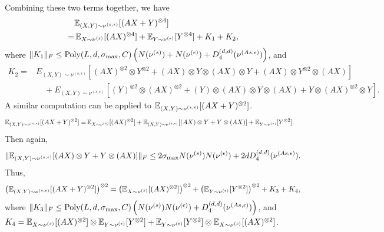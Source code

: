 Combining these two terms together, we have 
\begin{align*}
& \mathbb{E}_{(X,Y)\sim \nu^{(s,\epsilon)}} [(AX+Y)^{\otimes 4}]\\
 = & \,\mathbb{E}_{X\sim \nu^{(s)}}[(AX)^{\otimes 4}] + \mathbb{E}_{Y\sim \nu^{(\epsilon)}}[Y^{\otimes 4}] + K_1 +K_2,
\end{align*}
where $\|K_1\|_F \le\text{Poly}(L, d, \sigma_{\max}, C)\left(N(\nu^{(s)})+N(\nu^{(\epsilon)})+D_4^{(d,d)}(\nu^{(As,\epsilon)}) \right) $, and 
\begin{align*}
K_2  = & E_{(X,Y)\sim \nu^{(s,\epsilon)}} [ (AX)^{\otimes 2}\otimes Y^{\otimes 2} + (AX)\otimes Y\otimes (AX)\otimes Y + (AX)\otimes Y^{\otimes 2}\otimes (AX)]\\
& \quad+  E_{(X,Y)\sim \nu^{(s,\epsilon)}} [ (Y)^{\otimes 2}\otimes (AX)^{\otimes 2} + (Y)\otimes (AX)\otimes Y\otimes (AX) + Y\otimes (AX)^{\otimes 2}\otimes Y]. 
\end{align*}
A similar computation can be applied to $\mathbb{E}_{(X,Y)\sim \nu^{(s,\epsilon)}} [(AX+Y)^{\otimes 2}]$.
\begin{align*}
\mathbb{E}_{(X,Y)\sim \nu^{(s,\epsilon)}} [(AX+Y)^{\otimes 2}]= & \, \mathbb{E}_{X\sim \nu^{(s)}}[(AX)^{\otimes 2}] + \mathbb{E}_{(X,Y)\sim \nu^{(s,\epsilon)}}[(AX)\otimes Y + Y\otimes (AX)] + \mathbb{E}_{Y\sim \nu^{(\epsilon)}}[Y^{\otimes 2}].
\end{align*}
Then again,
\[
\|\mathbb{E}_{(X,Y)\sim \nu^{(s,\epsilon)}}[(AX)\otimes Y + Y\otimes (AX)]\|_F \le 2\sigma_{\max}N(\nu^{(s)})N(\nu^{(\epsilon)}) + 2dD_4^{(d,d)}(\nu^{(As,\epsilon)}).
\]
Thus, 
\[
\left( \mathbb{E}_{(X,Y)\sim \nu^{(s,\epsilon)}} [(AX+Y)^{\otimes 2}]\right)^{\otimes2} =  \left(\mathbb{E}_{X\sim \nu^{(s)}}[(AX)^{\otimes 2}]\right)^{\otimes2} + \left( \mathbb{E}_{Y\sim \nu^{(\epsilon)}}[Y^{\otimes 2}]\right)^{\otimes 2} + K_3+K_4,
\]
where $\|K_3\|_F \le \text{Poly}(L, d, \sigma_{\max}, C)\left( N(\nu^{(s)})N(\nu^{(\epsilon)}) + D_4^{(d,d)}(\nu^{(As,\epsilon)}) \right) $, and $K_4 = \mathbb{E}_{X\sim \nu^{(s)}}[(AX)^{\otimes 2}] \otimes \mathbb{E}_{Y\sim \nu^{(\epsilon)}}[Y^{\otimes 2}] + \mathbb{E}_{Y\sim \nu^{(\epsilon)}}[Y^{\otimes 2}] \otimes \mathbb{E}_{X\sim \nu^{(s)}}[(AX)^{\otimes 2}]$.

